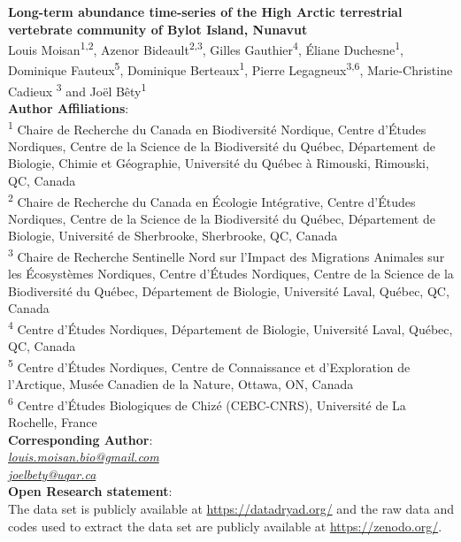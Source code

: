\documentclass[a4paper,twoside,12pt]{article}
\begin{document}
 
\begingroup  
  \centering
\textbf{Long-term abundance time-series of the High Arctic terrestrial vertebrate community of Bylot Island, Nunavut}\\[1.5em]
 Louis Moisan\textsuperscript{1,2}, Azenor Bideault\textsuperscript{2,3}, Gilles Gauthier\textsuperscript{4}, Éliane Duchesne\textsuperscript{1}, 
 Dominique Fauteux\textsuperscript{5}, Dominique Berteaux\textsuperscript{1}, Pierre Legagneux\textsuperscript{3,6}, Marie-Christine Cadieux \textsuperscript{3} and Joël Bêty\textsuperscript{1}\\[1.5em]
\textbf{Author Affiliations}:\\
\textsuperscript{1} Chaire de Recherche du Canada en Biodiversité Nordique, Centre d’Études Nordiques, Centre de la Science de la Biodiversité du Québec, Département de Biologie, Chimie et Géographie, Université du Québec à Rimouski, Rimouski, QC, Canada\\
\textsuperscript{2} Chaire de Recherche du Canada en Écologie Intégrative, Centre d’Études Nordiques, Centre de la Science de la Biodiversité du Québec, Département de Biologie, Université de Sherbrooke, Sherbrooke, QC, Canada\\
\textsuperscript{3} Chaire de Recherche Sentinelle Nord sur l’Impact des Migrations Animales sur les Écosystèmes Nordiques, Centre d’Études Nordiques, Centre de la Science de la Biodiversité du Québec, Département de Biologie, Université Laval, Québec, QC, Canada\\
\textsuperscript{4} Centre d’Études Nordiques, Département de Biologie, Université Laval, Québec, QC, Canada\\
\textsuperscript{5} Centre d’Études Nordiques, Centre de Connaissance et d’Exploration de l’Arctique, Musée Canadien de la Nature, Ottawa, ON, Canada\\
\textsuperscript{6} Centre d’Études Biologiques de Chizé (CEBC-CNRS), Université de La Rochelle, France 
\\[1.5em]
\textbf{Corresponding Author}:\\
\textit{\href{mailto:louis.moisan.bio@gmail.com}{louis.moisan.bio@gmail.com}}\\
\textit{\href{mailto:joel_bety@uqar.ca}{joel{\textunderscore}bety@uqar.ca}}
\\[1.5em]
\textbf{Open Research statement}:\\
The data set is publicly available at \url{https://datadryad.org/} and the raw data and codes used to extract the data set are publicly available at \url{https://zenodo.org/}.\\
\endgroup
\newpage
\end{document}
